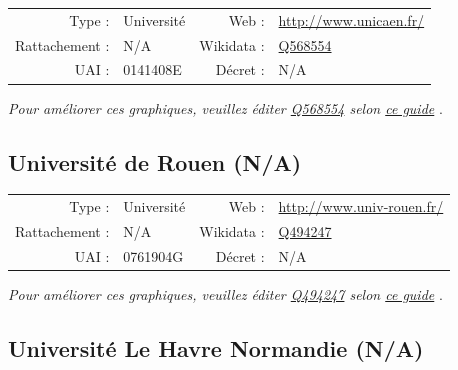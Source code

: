 \documentclass[11pt,french,landscape]{article}
\begin{document}
\begin{tabular*}{0.45\textwidth}{rp{2cm}rl}  
\hline  
Type : & Université & Web : &\href{http://www.unicaen.fr/}{http://www.unicaen.fr/} \\  
Rattachement : & N/A & Wikidata : & \href{https://www.wikidata.org/entity/Q568554}{Q568554} \\  
UAI : & 0141408E & Décret : & N/A \\  
\hline  
\end{tabular*}

\textit{\scriptsize Pour améliorer ces graphiques, veuillez éditer \href{https://www.wikidata.org/entity/Q568554}{Q568554}  selon \href{https://github.com/cpesr/wikidataESR/blob/master/Rmd/wikidataESR.md}{ce guide}}
.


\newpage

\hypertarget{universituxe9-de-rouen-na}{%
\subsection{Université de Rouen (N/A)}\label{universituxe9-de-rouen-na}}

\begin{tabular*}{0.45\textwidth}{rp{2cm}rl}  
\hline  
Type : & Université & Web : &\href{http://www.univ-rouen.fr/}{http://www.univ-rouen.fr/} \\  
Rattachement : & N/A & Wikidata : & \href{https://www.wikidata.org/entity/Q494247}{Q494247} \\  
UAI : & 0761904G & Décret : & N/A \\  
\hline  
\end{tabular*}

\textit{\scriptsize Pour améliorer ces graphiques, veuillez éditer \href{https://www.wikidata.org/entity/Q494247}{Q494247}  selon \href{https://github.com/cpesr/wikidataESR/blob/master/Rmd/wikidataESR.md}{ce guide}}
.


\newpage

\hypertarget{universituxe9-le-havre-normandie-na}{%
\subsection{Université Le Havre Normandie
(N/A)}\label{universituxe9-le-havre-normandie-na}}
\end{document}
